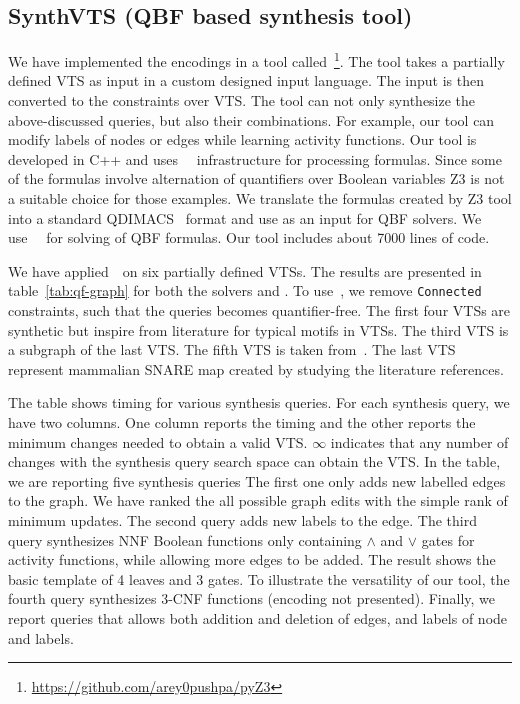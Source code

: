 \subsection{SynthVTS (QBF based synthesis tool)} 
We have implemented the encodings in a tool
called~\ourtool\footnote{{\url{https://github.com/arey0pushpa/pyZ3}}}.
%
The tool takes a partially defined VTS as input in a custom designed
input language.
%
The input is then converted to the constraints over VTS. 
%
The tool can not only synthesize the above-discussed queries, but also their
combinations.
%
For example, our tool can modify labels of nodes or edges while
learning activity functions.
%
Our tool is developed in C++ and uses~\zthree~\cite{z3} infrastructure for
processing formulas. 
%
Since some of the formulas involve alternation of quantifiers over
Boolean variables Z3 is not a suitable choice for those examples.
%
We translate the formulas created by Z3 tool into a standard
QDIMACS~\cite{qdimacs} format and use as an input for QBF solvers. 
%
We use~\depqbf~\cite{lonsing2010depqbf} for solving of QBF formulas. 
%
Our tool includes about 7000 lines of code.

We have applied~\ourtool~on six partially defined VTSs.
%
The results are presented in table~\ref{tab:qf-graph} for both the solvers
\depqbf and \zthree.
%
To use~\zthree, we remove \texttt{Connected} constraints, such that the queries becomes
quantifier-free.
%
%
%
The first four VTSs are synthetic but inspire from literature for
typical motifs in VTSs. 
The third VTS is a subgraph of the last VTS.
%
%
The fifth VTS is taken from~\cite{burri2004complete}.
%
The last VTS represent mammalian SNARE map created by studying the literature references.  

The table shows timing for various synthesis queries.
%
For each synthesis query, we have two columns.
%
One column reports the timing and the other reports the minimum changes
needed to obtain a valid VTS.
%
$\infty$ indicates that any number of changes with the synthesis query
search space can obtain the VTS.
%
In the table, we are reporting five synthesis queries
%
The first one only adds new labelled edges to the graph.
%
We have ranked the all possible graph edits with the simple rank of
minimum updates.
%
The second query adds new labels to the edge.
%
The third query synthesizes NNF Boolean functions only containing
$\land$ and $\lor$ gates for activity functions, while allowing
more edges to be added.
%
The result shows the basic template of 4 leaves and 3 gates.
%
%
To illustrate the versatility of our tool, the fourth query
synthesizes $3$-CNF functions (encoding not presented).
%
Finally, we report queries that allows both addition and deletion of edges, and labels
of node and labels. 

%
%

